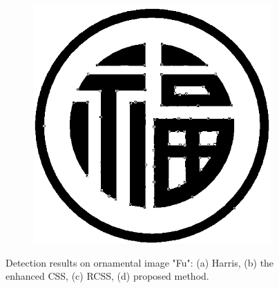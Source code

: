 \documentclass[letterpaper, 10 pt, conference]{ieeeconf}  %
\begin{document}
\begin{figure}[htbp]
\begin{subfigure}[b]{0.49\linewidth}
    	\caption{}
   	\end{subfigure}
  	     \begin{subfigure}[b]{0.49\linewidth}
      \includegraphics[width=\linewidth]{experiments/fu_final.png}
      \caption{}
    \end{subfigure}
      	\caption{Detection results on ornamental image "Fu": (a) Harris, (b) the enhanced CSS, (c) RCSS, (d) proposed method.}
  	\label{Results on Ornamental Images Fu}
	\end{figure}
\end{document}
